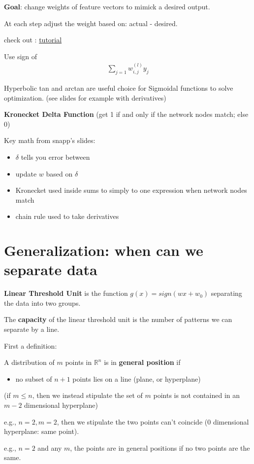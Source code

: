 \documentclass[12pt]{article}
\def\R{\ensuremath{\mathbb{R}}} %
\newcommand{\bt}[1]{\textbf{#1}} %
\newcommand{\eq}[1]{\begin{align*}#1\end{align*}} %
\renewcommand{\eq}[1]{\begin{align*}#1\end{align*}} %
\begin{document}
\bt{Goal}: change weights of feature vectors to mimick a desired output.

At each step adjust the weight based on: actual - desired.

check out : \href{"http://neuralnetworksanddeeplearning.com/chap2.html"}{tutorial}

Use sign of 
\eq{\sum_{j=1} w_{i,j}^{(l)} y_j}

Hyperbolic tan and arctan are useful choice for Sigmoidal functions to solve optimization. (see slides for example with derivatives)

\bt{Kronecket Delta Function} (get 1 if and only if the network nodes match; else 0)

Key math from snapp's slides: 
\begin{itemize}
\item $\delta$ tells you error between 
\item update $w$ based on $\delta$
\item Kronecket used inside sums to simply to one expression when network nodes match
\item chain rule used to take derivatives
\end{itemize}

\section*{Generalization: when can we separate data}

\bt{Linear Threshold Unit} is the function $g(x) = sign(wx + w_0)$ separating the data into two groups.

The \bt{capacity} of the linear threshold unit is the number of patterns we can separate by a line.

First a definition:

A distribution of $m$ points in $\R^n$ is in \bt{general position} if
\begin{itemize}
    \item no subset of $n+1$ points lies on a line (plane, or hyperplane)
\end{itemize}
    (if $m \leq n$, then we instead stipulate the set of $m$ points is not contained in an $m-2$ dimensional hyperplane)

e.g., $n = 2, m=2$, then we stipulate the two points can't coincide (0 dimensional hyperplane: same point).

e.g., $n=2$ and any $m$, the points are in general positions if no two points are the same.
\end{document}
